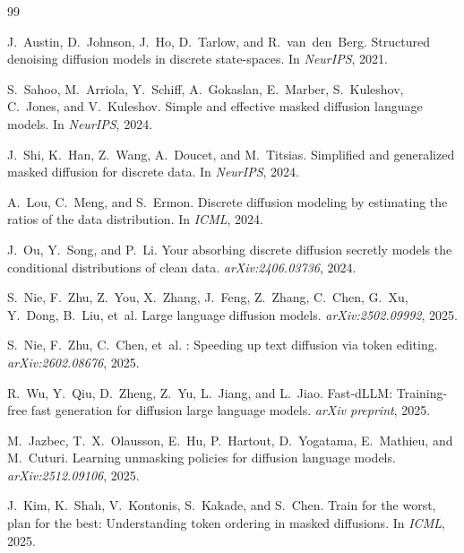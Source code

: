 \documentclass[11pt]{article}
\begin{document}


\begin{thebibliography}{99}

J.~Austin, D.~Johnson, J.~Ho, D.~Tarlow, and R.~van~den~Berg.
\newblock Structured denoising diffusion models in discrete state-spaces.
\newblock In \emph{NeurIPS}, 2021.

S.~Sahoo, M.~Arriola, Y.~Schiff, A.~Gokaslan, E.~Marber, S.~Kuleshov, C.~Jones, and V.~Kuleshov.
\newblock Simple and effective masked diffusion language models.
\newblock In \emph{NeurIPS}, 2024.

J.~Shi, K.~Han, Z.~Wang, A.~Doucet, and M.~Titsias.
\newblock Simplified and generalized masked diffusion for discrete data.
\newblock In \emph{NeurIPS}, 2024.

A.~Lou, C.~Meng, and S.~Ermon.
\newblock Discrete diffusion modeling by estimating the ratios of the data distribution.
\newblock In \emph{ICML}, 2024.

J.~Ou, Y.~Song, and P.~Li.
\newblock Your absorbing discrete diffusion secretly models the conditional distributions of clean data.
\newblock \emph{arXiv:2406.03736}, 2024.

S.~Nie, F.~Zhu, Z.~You, X.~Zhang, J.~Feng, Z.~Zhang, C.~Chen, G.~Xu, Y.~Dong, B.~Liu, et~al.
\newblock Large language diffusion models.
\newblock \emph{arXiv:2502.09992}, 2025.

S.~Nie, F.~Zhu, C.~Chen, et~al.
: Speeding up text diffusion via token editing.
\newblock \emph{arXiv:2602.08676}, 2025.

R.~Wu, Y.~Qiu, D.~Zheng, Z.~Yu, L.~Jiang, and L.~Jiao.
\newblock Fast-{dLLM}: Training-free fast generation for diffusion large language models.
\newblock \emph{arXiv preprint}, 2025.

M.~Jazbec, T.~X.~Olausson, E.~Hu, P.~Hartout, D.~Yogatama, E.~Mathieu, and M.~Cuturi.
\newblock Learning unmasking policies for diffusion language models.
\newblock \emph{arXiv:2512.09106}, 2025.

J.~Kim, K.~Shah, V.~Kontonis, S.~Kakade, and S.~Chen.
\newblock Train for the worst, plan for the best: Understanding token ordering in masked diffusions.
\newblock In \emph{ICML}, 2025.


\end{thebibliography}
\end{document}
